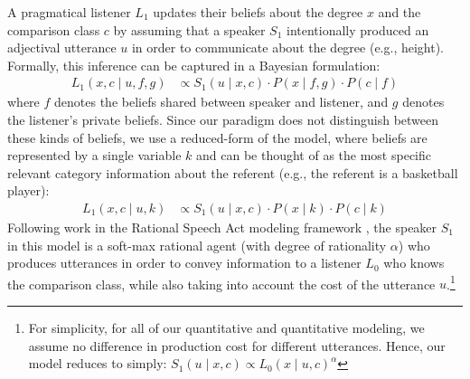 \documentclass[doc]{apa6}
\begin{document}

%
%
%
%
%

A pragmatical listener $L_1$ updates their beliefs about the degree $x$ and the comparison class $c$ by assuming that a speaker $S_1$ intentionally produced an adjectival utterance $u$ in order to communicate about the degree (e.g., height).
Formally, this inference can be captured in a Bayesian formulation:
%
\begin{align}
L_1(x, c \mid u, f, g) &\propto S_1(u \mid x, c) \cdot P(x \mid f, g) \cdot P(c \mid f) \label{eq:L1} 
\end{align}
%
\noindent where $f$ denotes the beliefs shared between speaker and listener, and $g$ denotes the listener's private beliefs. Since our paradigm does not distinguish between these kinds of beliefs, we use a reduced-form of the model, where beliefs are represented by a single variable $k$ and can be thought of as the most specific relevant category information about the referent (e.g., the referent is a basketball player): 
%
\begin{align}
L_1(x, c \mid u, k) &\propto S_1(u \mid x, c) \cdot P(x \mid k) \cdot P(c \mid k) \label{eq:L1a} 
\end{align}
%
Following work in the Rational Speech Act modeling framework \cite{Frank2012, Goodman2016, scontras2017probabilistic}, the speaker $S_1$ in this model is a soft-max rational agent (with degree of rationality $\alpha$) who produces utterances in order to convey information to a listener $L_0$ who knows the comparison class, while also taking into account the cost of the utterance $u$.\footnote{For simplicity, for all of our quantitative and quantitative modeling, we assume no difference in production cost for different utterances. Hence, our model reduces to simply: $S_1(u \mid x, c) \propto L_{0}(x \mid u, c)^{ \alpha}$}
\end{document}
